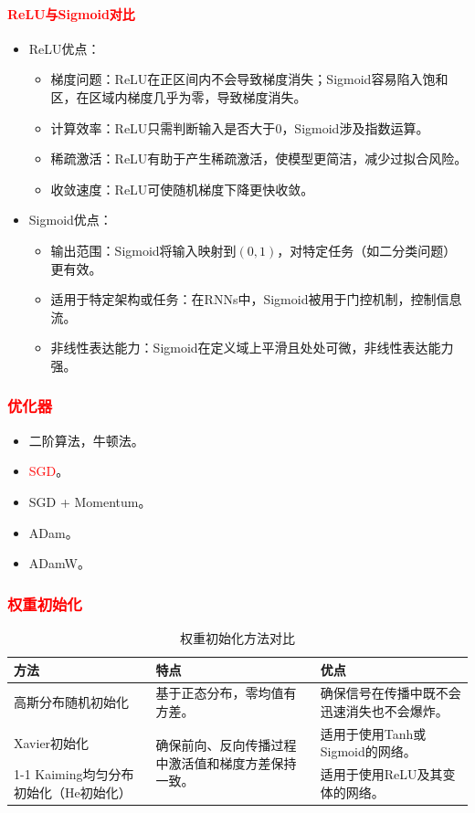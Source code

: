 \documentclass[
12pt, %
a4paper, 
oneside, %
]{scrartcl}
\begin{document}
\paragraph{\textcolor{red}{ReLU与Sigmoid对比}}
\begin{itemize}
\item ReLU优点：
\begin{itemize}
\item 梯度问题：ReLU在正区间内不会导致梯度消失；Sigmoid容易陷入饱和区，在区域内梯度几乎为零，导致梯度消失。
\item 计算效率：ReLU只需判断输入是否大于$ 0 $，Sigmoid涉及指数运算。
\item 稀疏激活：ReLU有助于产生稀疏激活，使模型更简洁，减少过拟合风险。
\item 收敛速度：ReLU可使随机梯度下降更快收敛。
\end{itemize}
\item Sigmoid优点：
\begin{itemize}
\item 输出范围：Sigmoid将输入映射到$ (0, 1) $，对特定任务（如二分类问题）更有效。
\item 适用于特定架构或任务：在RNNs中，Sigmoid被用于门控机制，控制信息流。
\item 非线性表达能力：Sigmoid在定义域上平滑且处处可微，非线性表达能力强。
\end{itemize}
\end{itemize}
\subsubsection[优化器]{\textcolor{red}{优化器}}
\begin{itemize}
\item 二阶算法，牛顿法。
\item \textcolor{red}{SGD}。
\item SGD + Momentum。
\item ADam。
\item ADamW。
\end{itemize}
\subsubsection[权重初始化]{\textcolor{red}{权重初始化}}
\begin{table}[H]
\centering
\begin{tabular}{|p{3cm}|p{5cm}|p{6cm}|}
\hline
方法 & 特点 & 优点 \\
\hline
高斯分布随机初始化 & 基于正态分布，零均值有方差。 & 确保信号在传播中既不会迅速消失也不会爆炸。 \\
\hline
Xavier初始化 & \multirow{2}{5cm}{确保前向、反向传播过程中激活值和梯度方差保持一致。} & 适用于使用Tanh或Sigmoid的网络。 \\
\cline{1-1}\cline{3-3}
Kaiming均匀分布初始化（He初始化） & & 适用于使用ReLU及其变体的网络。 \\
\hline
\end{tabular}
\caption{权重初始化方法对比}
\end{table}
\end{document}
